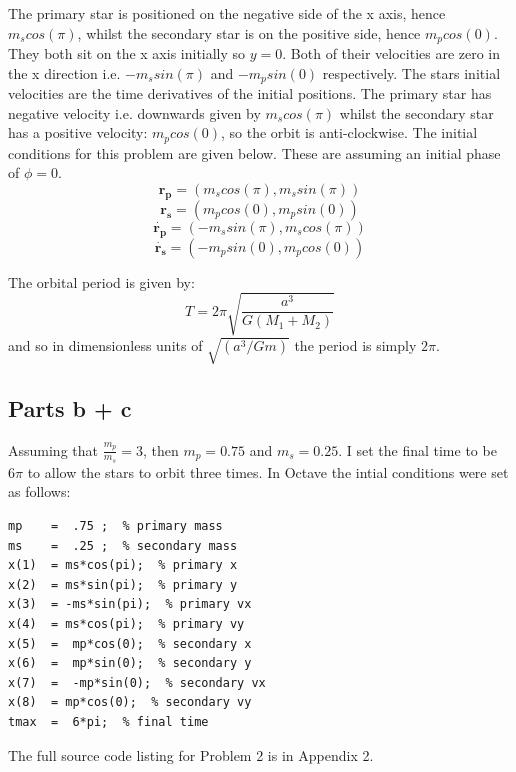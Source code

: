 \documentclass[a4paper,12pt]{article}
\begin{document}
The primary star is positioned on the negative side of the x axis, hence $m_scos(\pi)$, whilst the secondary star is on the positive side, hence $m_pcos(0)$. They both sit on the x axis initially so $y=0$. Both of their velocities are zero in the x direction i.e. $-m_ssin(\pi)$ and $-m_psin(0)$ respectively. The stars initial velocities are the time derivatives of the initial positions. The primary star has negative velocity i.e. downwards given by $m_scos(\pi)$ whilst the secondary star has a positive velocity: $m_pcos(0)$, so the orbit is anti-clockwise. 
The initial conditions for this problem are given below. These are assuming an initial phase of $\phi=0$.
\begin{equation}
\mathbf{r_p}=\left(m_scos\left(\pi\right),m_ssin\left(\pi\right)\right)
\end{equation}
\begin{equation}
\mathbf{r_s}=\left(m_pcos\left(0\right),m_psin\left(0\right)\right)
\end{equation}
\begin{equation}
\mathbf{\dot{r_p}}=\left(-m_ssin\left(\pi\right),m_scos\left(\pi\right)\right)
\end{equation}
\begin{equation}
\mathbf{\dot{r_s}}=\left(-m_psin\left(0\right),m_pcos\left(0\right)\right)
\end{equation}

The orbital period is given by:
\begin{equation}
T=2\pi\sqrt{\frac{a^3}{G\left(M_1+M_2\right)}}
\end{equation}
and so in dimensionless units of $\sqrt{\left(a^3/Gm\right)}$ the period is simply $2\pi$.


\subsection{Parts b + c}
Assuming that $\frac{m_p}{m_s}=3$, then $m_p=0.75$ and $m_s=0.25$. I set the final time to be $6\pi$ to allow the stars to orbit three times. In Octave the intial conditions were set as follows:
\begin{lstlisting}
mp    =  .75 ;  % primary mass
ms    =  .25 ;  % secondary mass
x(1)  = ms*cos(pi);  % primary x
x(2)  = ms*sin(pi);  % primary y
x(3)  = -ms*sin(pi);  % primary vx
x(4)  = ms*cos(pi);  % primary vy
x(5)  =  mp*cos(0);  % secondary x
x(6)  =  mp*sin(0);  % secondary y
x(7)  =  -mp*sin(0);  % secondary vx
x(8)  = mp*cos(0);  % secondary vy
tmax  =  6*pi;  % final time
\end{lstlisting}
The full source code listing for Problem 2 is in Appendix 2.
\end{document}
